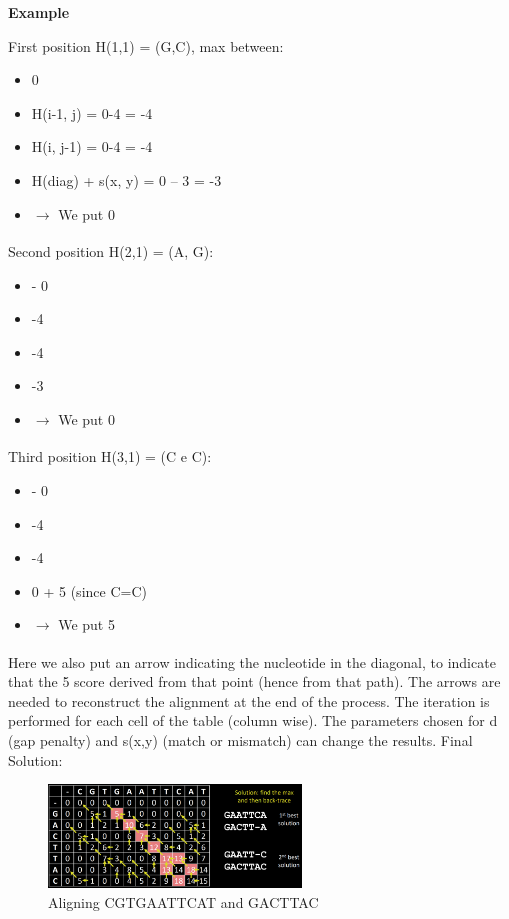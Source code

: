 \textbf{Example}

First position H(1,1) = (G,C), max between: 

\begin{itemize}
    \item 0
    \item H(i-1, j) = 0-4 = -4
    \item H(i, j-1) = 0-4 = -4
    \item H(diag) + s(x, y) = 0 – 3 = -3
    \item $\xrightarrow[]{}$ We put 0
\end{itemize}

Second position H(2,1) = (A, G):

\begin{itemize}
    \item - 0
    \item -4
    \item -4
    \item -3
    \item $\xrightarrow[]{}$ We put 0
\end{itemize}

Third position H(3,1) = (C e C):

\begin{itemize}
    \item - 0
    \item -4
    \item -4
    \item 0 + 5 (since C=C)
    \item $\xrightarrow[]{}$ We put 5 
\end{itemize}

Here we also put an arrow indicating the nucleotide in the diagonal, to indicate that the 5 score derived from that point (hence from that path).  The arrows are needed to reconstruct the alignment at the end of the process. The iteration is performed for each cell of the table (column wise).
The parameters chosen for d (gap penalty) and s(x,y) (match or mismatch) can change the results. 
Final Solution: 

\begin{figure}[h]
\centering
\includegraphics[width=0.6\textwidth]{Aligning.png}
\caption{Aligning CGTGAATTCAT and GACTTAC}
\end{figure}

